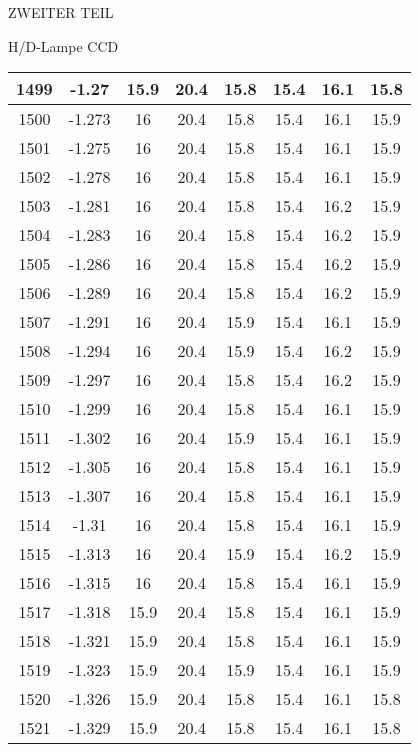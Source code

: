 \begin{appendix}
\begin{chapter}{ZWEITER TEIL}
\begin{section}{H/D-Lampe CCD}
\begin{scriptsize}
\begin{longtable}[htbp]{|c|c|c|c|c|c|c|c|}
            1499 & -1.27 & 15.9 & 20.4 & 15.8 & 15.4 & 16.1 & 15.8 \\ \hline
            1500 & -1.273 & 16 & 20.4 & 15.8 & 15.4 & 16.1 & 15.9 \\ \hline
            1501 & -1.275 & 16 & 20.4 & 15.8 & 15.4 & 16.1 & 15.9 \\ \hline
            1502 & -1.278 & 16 & 20.4 & 15.8 & 15.4 & 16.1 & 15.9 \\ \hline
            1503 & -1.281 & 16 & 20.4 & 15.8 & 15.4 & 16.2 & 15.9 \\ \hline
            1504 & -1.283 & 16 & 20.4 & 15.8 & 15.4 & 16.2 & 15.9 \\ \hline
            1505 & -1.286 & 16 & 20.4 & 15.8 & 15.4 & 16.2 & 15.9 \\ \hline
            1506 & -1.289 & 16 & 20.4 & 15.8 & 15.4 & 16.2 & 15.9 \\ \hline
            1507 & -1.291 & 16 & 20.4 & 15.9 & 15.4 & 16.1 & 15.9 \\ \hline
            1508 & -1.294 & 16 & 20.4 & 15.9 & 15.4 & 16.2 & 15.9 \\ \hline
            1509 & -1.297 & 16 & 20.4 & 15.8 & 15.4 & 16.2 & 15.9 \\ \hline
            1510 & -1.299 & 16 & 20.4 & 15.8 & 15.4 & 16.1 & 15.9 \\ \hline
            1511 & -1.302 & 16 & 20.4 & 15.9 & 15.4 & 16.1 & 15.9 \\ \hline
            1512 & -1.305 & 16 & 20.4 & 15.8 & 15.4 & 16.1 & 15.9 \\ \hline
            1513 & -1.307 & 16 & 20.4 & 15.8 & 15.4 & 16.1 & 15.9 \\ \hline
            1514 & -1.31 & 16 & 20.4 & 15.8 & 15.4 & 16.1 & 15.9 \\ \hline
            1515 & -1.313 & 16 & 20.4 & 15.9 & 15.4 & 16.2 & 15.9 \\ \hline
            1516 & -1.315 & 16 & 20.4 & 15.8 & 15.4 & 16.1 & 15.9 \\ \hline
            1517 & -1.318 & 15.9 & 20.4 & 15.8 & 15.4 & 16.1 & 15.9 \\ \hline
            1518 & -1.321 & 15.9 & 20.4 & 15.8 & 15.4 & 16.1 & 15.9 \\ \hline
            1519 & -1.323 & 15.9 & 20.4 & 15.9 & 15.4 & 16.1 & 15.9 \\ \hline
            1520 & -1.326 & 15.9 & 20.4 & 15.8 & 15.4 & 16.1 & 15.8 \\ \hline
            1521 & -1.329 & 15.9 & 20.4 & 15.8 & 15.4 & 16.1 & 15.8 \\ \hline

\end{longtable}
\end{scriptsize}
\end{section}
\end{chapter}
\end{appendix}
